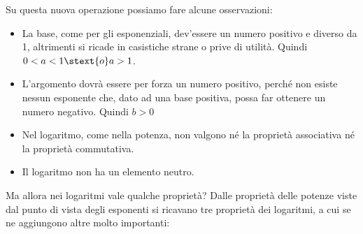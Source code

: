 Su questa nuova operazione possiamo fare alcune osservazioni:

\begin{itemize}
 \item La base, come per gli esponenziali, dev'essere un numero positivo e 
diverso da 1, altrimenti si ricade in casistiche strane o prive di utilità.
Quindi \(0<a<1 \stext{ o } a>1\).
 \item L'argomento dovrà essere per forza un numero positivo, perché non 
esiste nessun esponente che, dato ad una base positiva, possa far ottenere 
un numero negativo. Quindi \(b>0\)
 \item Nel logaritmo, come nella potenza, non valgono né la proprietà 
associativa né la proprietà commutativa.
 \item Il logaritmo non ha un elemento neutro.
\end{itemize}

\noindent Ma allora nei logaritmi vale qualche proprietà? 
Dalle proprietà delle potenze viste dal punto di vista degli 
esponenti si ricavano tre proprietà dei logaritmi, a cui se ne aggiungono 
altre molto importanti:
% 

